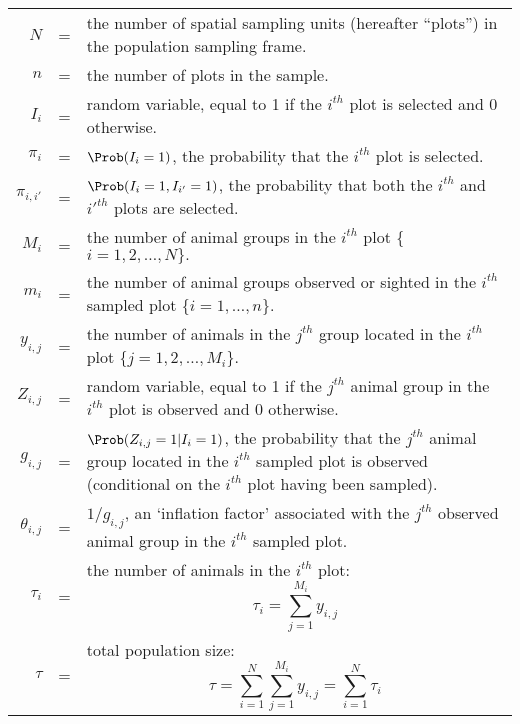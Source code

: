 \documentclass[nojss]{jss}
\begin{document}
\begin{tabular}{r c p{14cm}}
$N$ & = & the number of spatial sampling units (hereafter ``plots'') in the population sampling frame.\\
$n$ & = & the number of plots in the sample. \\
$I_{i}$ & = & random variable, equal to 1 if the $i^{th}$ plot is selected and 0 otherwise.\\
$\pi_{i}$ & = & $\Prob(I_{i}=1)$, the probability that the $i^{th}$ plot is selected. \\
$\pi_{i,i'}$ & = & $\Prob(I_{i}=1, I_{i'}=1)$, the probability that both the $i^{th}$ and $i'^{th}$ plots are selected. \\
$M_{i}$ & = & the number of animal groups in the $i^{th}$ plot \{$i=1, 2,\ldots, N\}.$\\
$m_{i}$ & = & the number of animal groups observed or sighted in the $i^{th}$ sampled plot \{$i=1,\ldots,n\}.$\\
$y_{i,j}$ & = & the number of animals in the $j^{th}$ group located in the $i^{th}$ plot \{$j=1,2,\ldots,M_{i}$\}.\\
$Z_{i,j}$ & = & random variable, equal to 1 if the $j^{th}$ animal group in the $i^{th}$ plot is observed and 0 otherwise.  \\
$g_{i,j}$ & = & $\Prob(Z_{i,j}=1 | I_{i}=1)$, the probability that the $j^{th}$ animal group located in the $i^{th}$ sampled plot is observed (conditional on the $i^{th}$ plot
having been sampled).\\
$\theta_{i,j}$ & = & $1/g_{i,j}$, an `inflation factor' associated with the $j^{th}$ observed animal group in the $i^{th}$ sampled plot.\\
$\tau_{i}$ & = & the number of animals in the $i^{th}$ plot: $$\tau_{i} = \sum_{j=1}^{M_{i}}y_{i,j}$$ \\
$\tau$ & = & total population size: $$\tau = \sum_{i=1}^{N}\sum_{j=1}^{M_{i}}y_{i,j}=\sum_{i=1}^{N}\tau_{i}$$\\

\end{tabular}
\end{document}
